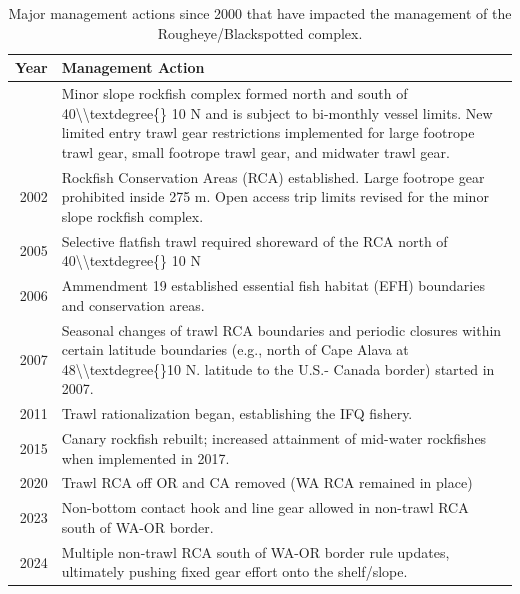 \documentclass[
]{scrartcl}
\begin{document}
\begin{longtable}{r>{\raggedright\arraybackslash}p{\dimexpr 300.00pt -2\tabcolsep-1.5\arrayrulewidth}}

\caption{\label{tbl-management_summary}Major management actions since
2000 that have impacted the management of the Rougheye/Blackspotted
complex.}

\tabularnewline

\toprule
Year & Management Action \\ 
\midrule\addlinespace[2.5pt]
2000 & Minor slope rockfish complex formed north and south of 40\textbackslash{}\textbackslash{}textdegree\{\} 10 N and is subject to bi-monthly vessel limits. New limited entry trawl gear restrictions implemented for large footrope trawl gear, small footrope trawl gear, and midwater trawl gear. \\ 
2002 & Rockfish Conservation Areas (RCA) established. Large footrope gear prohibited inside 275 m. Open access trip limits revised for the minor slope rockfish complex. \\ 
2005 & Selective flatfish trawl required shoreward of the RCA north of 40\textbackslash{}\textbackslash{}textdegree\{\} 10 N \\ 
2006 & Ammendment 19 established essential fish habitat (EFH) boundaries and conservation areas. \\ 
2007 & Seasonal changes of trawl RCA boundaries and periodic closures within certain latitude boundaries (e.g., north of Cape Alava at 48\textbackslash{}\textbackslash{}textdegree\{\}10 N. latitude to the U.S.- Canada border) started in 2007. \\ 
2011 & Trawl rationalization began, establishing the IFQ fishery. \\ 
2015 & Canary rockfish rebuilt; increased attainment of mid-water rockfishes when implemented in 2017.  \\ 
2020 & Trawl RCA off OR and CA removed (WA RCA remained in place) \\ 
2023 & Non-bottom contact hook and line gear allowed in non-trawl RCA south of WA-OR border. \\ 
2024 & Multiple non-trawl RCA south of WA-OR border rule updates, ultimately pushing fixed gear effort onto the shelf/slope.  \\ 
\bottomrule

\end{longtable}

\endgroup

\pagebreak
\end{document}
